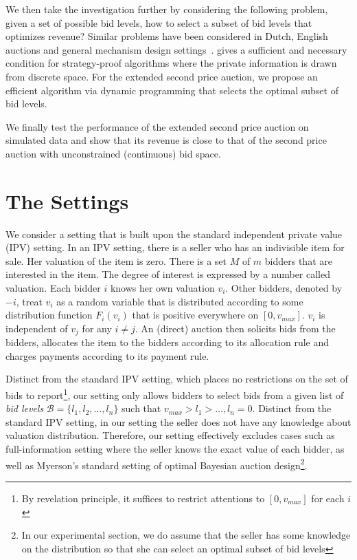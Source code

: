 \documentclass[letterpaper]{article}
\begin{document}
We then take the investigation further by considering the following problem, given a set of possible bid levels, how to select a subset of bid levels that optimizes revenue? Similar problems have been considered in Dutch, English auctions and general mechanism design settings~\cite{rothkopf1994role,li2011revenue,sujarittanonta2010design,david2007optimal,blumrosen2013mechanism}.
\cite{mu2008mechanism} gives a sufficient and necessary condition for strategy-proof algorithms where the private information is drawn from discrete space. 
For the extended second price auction, we propose an efficient algorithm via dynamic programming that selects the optimal subset of bid levels.

We finally test the performance of the extended second price auction on simulated data and show that its revenue is close to that of the second price auction with unconstrained (continuous) bid space.


\section{The Settings}

We consider a setting that is built upon the standard independent private value (IPV) setting. In an IPV setting, there is a seller who has an indivisible item for sale. Her valuation of the item is zero. There is a set $M$ of $m$ bidders that are interested in the item. The degree of interest is expressed by a number called valuation. Each bidder $i$ knows her own valuation $v_i$. Other bidders, denoted by $-i$, treat $v_i$ as a random variable that is distributed according to some distribution function $F_i(v_i)$ that is positive everywhere on $[0, v_{max}]$. $v_i$ is independent of $v_j$ for any $i\neq j$. An (direct) auction then solicits bids from the bidders, allocates the item to the bidders according to its {allocation rule} and charges payments according to its payment rule.

Distinct from the standard IPV setting, which places no restrictions on the set of bids to report\footnote{By revelation principle, it suffices to restrict attentions to $[0, v_{max}]$ for each $i$}, our setting only allows bidders to select bids from a given list of {\em bid levels} $\mathcal{B}=\{l_1,l_2,\ldots,l_n\}$ such that $v_{max}>l_1>\ldots,l_n=0$. Distinct from the standard IPV setting, in our setting the seller does not have any knowledge about valuation distribution. Therefore, our setting effectively excludes cases such as full-information setting where the seller knows the exact value of each bidder, as well as Myerson's standard setting of optimal Bayesian auction design\footnote{In our experimental section, we do assume that the seller has some knowledge on the distribution so that she can select an optimal subset of bid levels}.
\end{document}
